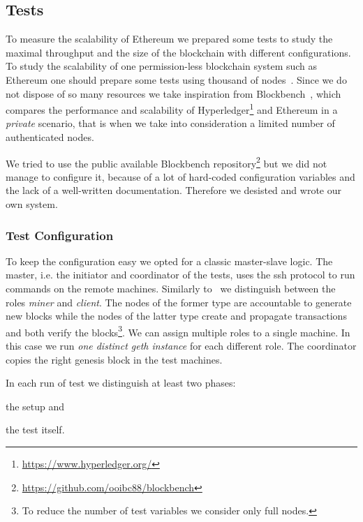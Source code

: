 \subsection{Tests}
\label{sec:tests}

To measure the scalability of Ethereum we prepared some tests to study the
maximal throughput and the size of the blockchain with different configurations.
To study the scalability of one permission-less blockchain system such as
Ethereum one should prepare some tests using thousand of
nodes~\cite{bib:securityAndScalabilityPoW, bib:algorand}. Since we do not
dispose of so many resources we take inspiration from
Blockbench~\cite{blockbench}, which compares the performance and scalability of
Hyperledger\footnote{\url{https://www.hyperledger.org/}} and Ethereum in a
\emph{private} scenario, that is when we take into consideration a limited
number of authenticated nodes.

We tried to use the public available Blockbench
repository\footnote{\url{https://github.com/ooibc88/blockbench}} but we did not
manage to configure it, because of a lot of hard-coded configuration variables
and the lack of a well-written documentation. Therefore we desisted and wrote
our own system.


\subsubsection{Test Configuration}

To keep the configuration easy we opted for a classic master-slave logic. The
master, i.e. the initiator and coordinator of the tests, uses the ssh protocol
to run commands on the remote machines. Similarly to~\cite{blockbench} we
distinguish between the roles \emph{miner} and \emph{client}. The nodes of the
former type are accountable to generate new blocks while the nodes of the latter
type create and propagate transactions and both verify the blocks\footnote{To
reduce the number of test variables we consider only full nodes.}. We can assign
multiple roles to a single machine. In this case we run \emph{one distinct geth
instance} for each different role. The coordinator copies the right genesis
block in the test machines.

In each run of test we distinguish at least two phases:
\begin{enumerate*}
  \item the setup and
  \item the test itself.
\end{enumerate*}

